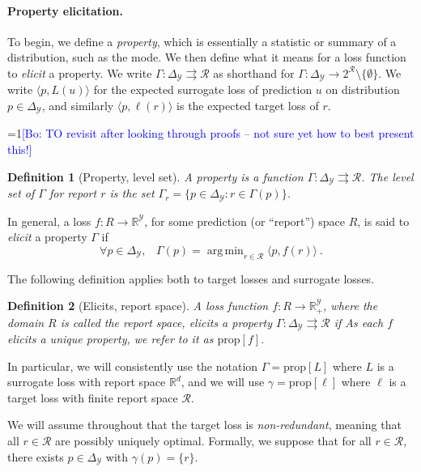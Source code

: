 \documentclass{article}
\newtheorem{definition}{Definition}
\newcommand{\Comments}{1}
\newcommand{\mynote}[2]{\ifnum\Comments=1\textcolor{#1}{#2}\fi}
\newcommand{\bo}[1]{\mynote{blue}{[Bo: #1]}}
\DeclareMathOperator*{\argmin}{arg\,min}
\newcommand{\reals}{\mathbb{R}}
\newcommand{\prop}[1]{\mathrm{prop}[#1]}
\newcommand{\simplex}{\Delta_\Y}
\newcommand{\R}{\mathcal{R}}
\newcommand{\Y}{\mathcal{Y}}
\newcommand{\inprod}[2]{\langle #1, #2 \rangle}%
\newcommand{\toto}{\rightrightarrows}
\begin{document}
\paragraph{Property elicitation.}
To begin, we define a \emph{property}, which is essentially a statistic or summary of a distribution, such as the mode.
We then define what it means for a loss function to \emph{elicit} a property.
We write $\Gamma: \simplex \toto \R$ as shorthand for $\Gamma: \simplex \to 2^{\R} \setminus \{\emptyset\}$.
We write $\inprod{p}{L(u)}$ for the expected surrogate loss of prediction $u$ on distribution $p \in \simplex$, and similarly $\inprod{p}{\ell(r)}$ is the expected target loss of $r$.




\bo{TO revisit after looking through proofs -- not sure yet how to best present this!}
\begin{definition}[Property, level set]\label{def:property}
  A \emph{property} is a function $\Gamma:\simplex\toto\R$.
  The \emph{level set} of $\Gamma$ for report $r$ is the set $\Gamma_r = \{p \in \simplex : r \in \Gamma(p)\}$.
\end{definition}
In general, a loss $f: R \to \reals^{\Y}$, for some prediction (or ``report'') space $R$, is said to \emph{elicit} a property $\Gamma$ if
\begin{equation}
  \forall p\in\simplex,\;\;\;\Gamma(p) = \argmin_{r \in \R} \inprod{p}{f(r)}~.
\end{equation}

The following definition applies both to target losses and surrogate losses.
\begin{definition}[Elicits, report space]
  \label{def:elicits}
  A loss function $f:R\to\reals^\Y_+$, where the domain $R$ is called the \emph{report space}, \emph{elicits} a property $\Gamma:\simplex \toto \R$ if
  As each $f$ elicits a unique property, we refer to it as $\prop{f}$.
\end{definition}
In particular, we will consistently use the notation $\Gamma = \prop{L}$ where $L$ is a surrogate loss with report space $\reals^d$, and we will use $\gamma = \prop{\ell}$ where $\ell$ is a target loss with finite report space $\R$.

We will assume throughout that the target loss is \emph{non-redundant}, meaning that all $r \in \R$ are possibly uniquely optimal.
Formally, we suppose that for all $r \in \R$, there exists $p \in \simplex$ with $\gamma(p) = \{r\}$.
\end{document}
